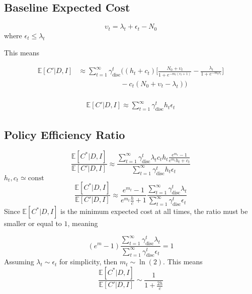 \subsection{Baseline Expected Cost}

\begin{equation}
	\upsilon_t= \lambda_t+\epsilon_t-N_0
\end{equation}
where $\epsilon_t\leq \lambda_t$

This means

\begin{equation}
	\begin{split}
		\mathbb{E}[C'|D,I] &\approx \sum_{t=1}^{\infty} \gamma_{\text{disc}}^{t} \bigg( 
		(h_t+c_t)\bigg[\frac{N_0 + \upsilon_t}{1+e^{-m_t(\epsilon_t+1)}}- \frac{\lambda_t}{1+e^{-m_t\epsilon_t}}\bigg]\\
		&\qquad\qquad\qquad
		- c_t(N_0 + \upsilon_t-\lambda_t)\bigg)\\
	\end{split}
\end{equation}

\begin{equation}
	\begin{split}
		\mathbb{E}[C'|D,I] \approx \sum_{t=1}^{\infty} \gamma_{\text{disc}}^{t} h_t\epsilon_t
	\end{split}
\end{equation}


\subsection{Policy Efficiency Ratio}

\begin{equation}
	\frac{\mathbb{E}[C^*|D,I] }{\mathbb{E}[C'|D,I]}\approx \frac{\sum_{t=1}^{\infty} \gamma_{\text{disc}}^{t} \lambda_tc_th_t\frac{e^{m_t}-1}{e^{m_t}h_t+c_t}}{\sum_{t=1}^{\infty} \gamma_{\text{disc}}^{t} h_t\epsilon_t}
\end{equation}
$h_t,c_t\simeq \text{const}$
\begin{equation}
		\frac{\mathbb{E}[C^*|D,I] }{\mathbb{E}[C'|D,I]}\approx \frac{e^{m_t}-1}{e^{m_t}\frac{h}{c}+1}\frac{\sum_{t=1}^{\infty} \gamma_{\text{disc}}^{t} \lambda_t}{\sum_{t=1}^{\infty} \gamma_{\text{disc}}^{t} \epsilon_t}
\end{equation}
Since $\mathbb{E}[C^*|D,I]$ is the minimum expected cost at all times, the ratio must be smaller or equal to $1$, meaning

\begin{equation}
	(e^{m}-1)\frac{\sum_{t=1}^{\infty} \gamma_{\text{disc}}^{t} \lambda_t}{\sum_{t=1}^{\infty} \gamma_{\text{disc}}^{t} \epsilon_t}=1
\end{equation}
Assuming $\lambda_t\sim \epsilon_t$ for simplicity, then $m_t\sim \ln(2)$. This means
\begin{equation}
	\frac{\mathbb{E}[C^*|D,I] }{\mathbb{E}[C'|D,I]}\sim \frac{1}{1+\frac{2h}{c}}
\end{equation}

